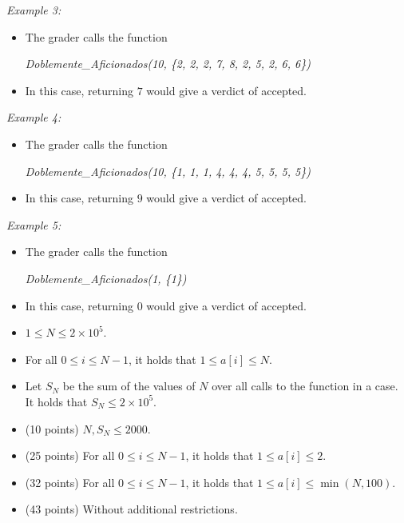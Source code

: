 \documentclass[12pt]{scrartcl}
\begin{document}
        {\itshape Example 3:}
        \begin{itemize}
            \item The grader calls the function 
            
            \begin{center}
                {\itshape Doblemente\_Aficionados(10, \{2, 2, 2, 7, 8, 2, 5, 2, 6, 6\})}
            \end{center}

            \item In this case, returning $7$ would give a verdict of accepted.
        \end{itemize}

        {\itshape Example 4:}
        \begin{itemize}
            \item The grader calls the function 

            \begin{center}
                {\itshape Doblemente\_Aficionados(10, \{1, 1, 1, 4, 4, 4, 5, 5, 5, 5\})}
            \end{center}

            \item In this case, returning $9$ would give a verdict of accepted.
        \end{itemize}
        
        {\itshape Example 5:}
        \begin{itemize}
            \item The grader calls the function 

            \begin{center}
                {\itshape Doblemente\_Aficionados(1, \{1\})}
            \end{center}

            \item In this case, returning $0$ would give a verdict of accepted.
        \end{itemize}
        
        \begin{itemize}
            \item $1 \le N \le 2 \times 10^5$.
            \item For all $0 \le i \le N - 1$, it holds that $1 \le a[i] \le N$.
            \item Let $S_N$ be the sum of the values of $N$ over all calls to the function in a case. It holds that $S_N \le 2\times10^5$.
        \end{itemize}
    

    \begin{itemize}
        \item (10 points) $N, S_N \le 2000$.
        \item (25 points) For all $0 \le i \le N - 1$, it holds that $1 \le a[i] \le 2$.
        \item (32 points) For all $0 \le i \le N - 1$, it holds that $1 \le a[i] \le \min(N, 100)$.
        \item (43 points) Without additional restrictions.
    \end{itemize}
\end{document}
